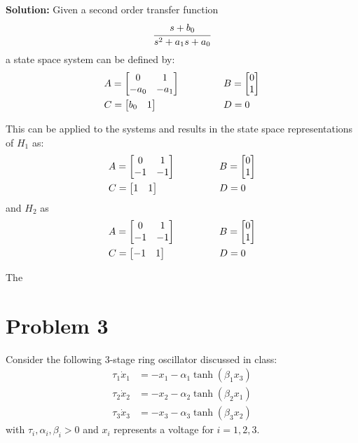 \documentclass[letter]{article}
\begin{document}
\noindent
\textbf{Solution:}
Given a second order transfer function $$\cfrac{s + b_0}{s^2 + a_1 s + a_0}$$ a state space system can be defined by:
\begin{equation}
	\begin{aligned}
		&A = \mqty[0 &1\\ -a_0 &-a_1] \hspace{0.5in} &&B = \mqty[0\\ 1]\\
		&C = \mqty[b_0 & 1] \hspace{0.5in} &&D = 0
	\end{aligned}
\end{equation}

This can be applied to the systems and results in the state space representations of $H_1$ as:
\begin{equation}
	\begin{aligned}
		&A = \mqty[0 &1\\ -1 &-1] \hspace{0.5in} &&B = \mqty[0\\ 1]\\
		&C = \mqty[1 & 1] \hspace{0.5in} &&D = 0
	\end{aligned}
\end{equation}
and $H_2$ as
\begin{equation}
	\begin{aligned}
		&A = \mqty[0 &1\\ -1 &-1] \hspace{0.5in} &&B = \mqty[0\\ 1]\\
		&C = \mqty[-1 & 1] \hspace{0.5in} &&D = 0
	\end{aligned}
\end{equation}

The 


\newpage
\section{Problem 3}
Consider the following 3-stage ring oscillator discussed in class:
\begin{align*}
	\tau_1 \dot{x}_1 &= -x_1 - \alpha_1 \tanh(\beta_1 x_3)\\
	\tau_2 \dot{x}_2 &= -x_2 - \alpha_2 \tanh(\beta_2 x_1)\\
	\tau_3 \dot{x}_3 &= -x_3 - \alpha_3 \tanh(\beta_3 x_2)
\end{align*}
with $\tau_i, \alpha_i, \beta_i > 0$ and $x_i$ represents a voltage for $i = 1,2,3$.
\end{document}
